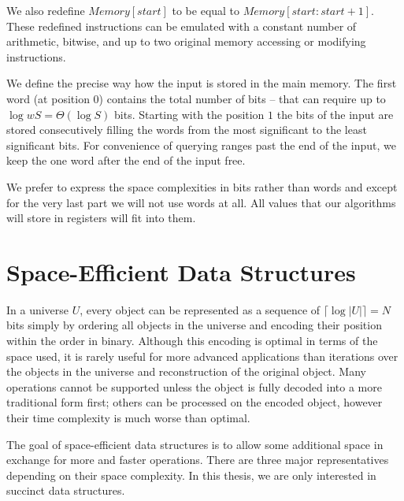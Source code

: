 We also redefine $\mathit{Memory}[\mathit{start}]$ to be equal to $\mathit{Memory}[\mathit{start}:\mathit{start} + 1]$.
These redefined instructions can be emulated with a constant number of arithmetic, bitwise, and up to two original memory accessing or modifying instructions.

We define the precise way how the input is stored in the main memory.
The first word (at position $0$) contains the total number of bits -- that can require up to $\log w S = \Theta(\log S)$ bits.
Starting with the position $1$ the bits of the input are stored consecutively filling the words from the most significant to the least significant bits.
For convenience of querying ranges past the end of the input, we keep the one word after the end of the input free.

We prefer to express the space complexities in bits rather than words and except for the very last part we will not use words at all.
All values that our algorithms will store in registers will fit into them.

\section{Space-Efficient Data Structures}

In a universe $U$, every object can be represented as a sequence of $\lceil \log |U| \rceil = N$ bits simply by ordering all objects in the universe and encoding their position within the order in binary.
Although this encoding is optimal in terms of the space used, it is rarely useful for more advanced applications than iterations over the objects in the universe and reconstruction of the original object.
Many operations cannot be supported unless the object is fully decoded into a more traditional form first; others can be processed on the encoded object, however their time complexity is much worse than optimal.

The goal of space-efficient data structures is to allow some additional space in exchange for more and faster operations.
There are three major representatives depending on their space complexity.
In this thesis, we are only interested in succinct data structures.

